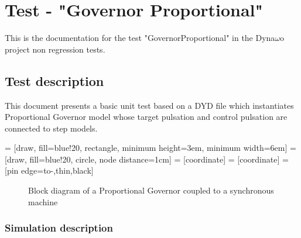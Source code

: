 \documentclass[a4paper, 12pt]{report}
\begin{document}
\chapter*{Test - "Governor Proportional"}
This is the documentation for the test "GovernorProportional" in the Dyna$\omega$o project non regression tests.

\section*{Test description}

This document presents a basic unit test based on a DYD file which instantiates Proportional Governor model whose target pulsation and control pulsation are connected to step models.


 = [draw, fill=blue!20, rectangle,
    minimum height=3em, minimum width=6em]
 = [draw, fill=blue!20, circle, node distance=1cm]
 = [coordinate]
 = [coordinate]
 = [pin edge={to-,thin,black}]

\begin{figure}[H]
  \setlength{\belowcaptionskip}{15pt}
  \caption{Block diagram of a Proportional Governor coupled to a synchronous machine}
\end{figure}


\subsection*{Simulation description}
\end{document}

